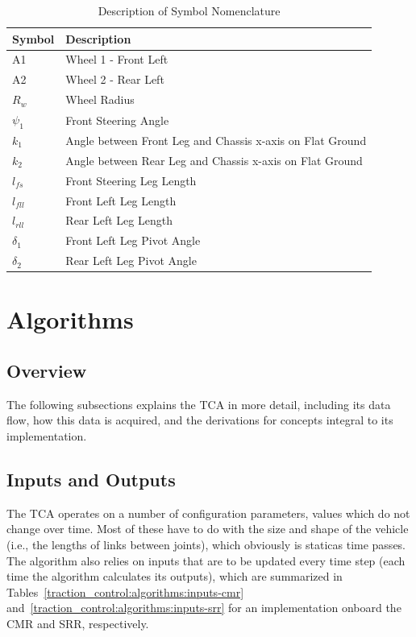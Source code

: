 \begin{table}[H]
\begin{center}\label{table:2}
	\begin{tabular}{| >{\centering\arraybackslash} m{1.2in} | >{\centering\arraybackslash} m{4.5in} |} 
		\hline
		Symbol & Description \\
		\hline
		A1 & Wheel 1 - Front Left \\
		A2 & Wheel 2 - Rear Left \\
		$R_{w}$ & Wheel Radius \\
		$\psi_{1}$ & Front Steering Angle \\
		$k_{1}$ & Angle between Front Leg and Chassis x-axis on Flat Ground \\
		$k_{2}$ & Angle between Rear Leg and Chassis x-axis on Flat Ground \\
		$l_{fs}$ & Front Steering Leg Length \\ 
		$l_{fll}$ & Front Left Leg Length \\ 
		$l_{rll}$ & Rear Left Leg Length \\ 
		$\delta_{1}$ & Front Left Leg Pivot Angle    \\
		$\delta_{2}$ & Rear Left Leg Pivot Angle   \\
		\hline
	
	\end{tabular}
\caption{Description of Symbol Nomenclature}
\end{center}
\end{table}


\section{Algorithms}
\subsection{Overview}
The following subsections explains the \ac{TCA} in more detail, including its data flow, how this data is acquired, and the derivations for concepts integral to its implementation.

\subsection{Inputs and Outputs}
The \ac{TCA} operates on a number of configuration parameters, values which do not change over time. Most of these have to do with the size and shape of the vehicle (i.e., the lengths of links between joints), which obviously is staticas time passes. The algorithm also relies on inputs that are to be updated every time step (each time the algorithm calculates its outputs), which are summarized in Tables~\ref{traction_control:algorithms:inputs-cmr} and~\ref{traction_control:algorithms:inputs-srr} for an implementation onboard the \ac{CMR} and \ac{SRR}, respectively.

